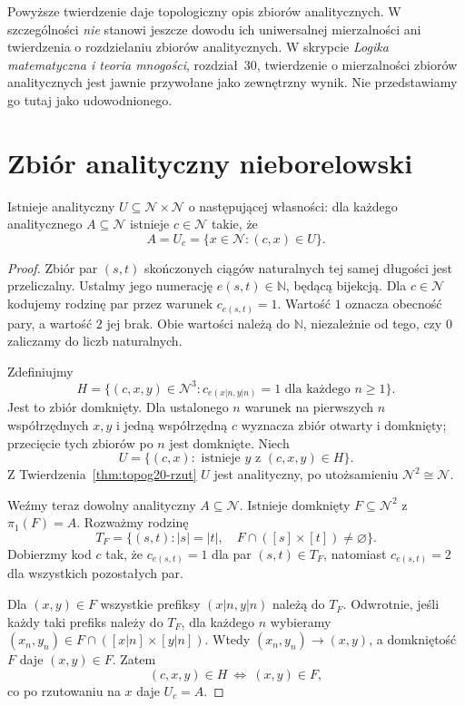 \begin{uwaga}
\label{rem:topog20-no-meas}
Powyższe twierdzenie daje
topologiczny opis zbiorów analitycznych.
W szczególności \emph{nie} stanowi
jeszcze dowodu ich uniwersalnej
mierzalności ani twierdzenia
o rozdzielaniu zbiorów analitycznych.
W skrypcie \emph{Logika matematyczna
i teoria mnogości}, rozdział~30,
twierdzenie o mierzalności
zbiorów analitycznych jest
jawnie przywołane jako zewnętrzny wynik.
Nie przedstawiamy go tutaj
jako udowodnionego.
\end{uwaga}

\section{Zbiór analityczny nieborelowski}
\label{sec:topog20-nieborelowski}

\begin{lemat}
\label{lem:topog20-universal}
Istnieje analityczny
\(U\subseteq\mathcal N\times\mathcal N\)
o następującej własności:
dla każdego analitycznego
\(A\subseteq\mathcal N\)
istnieje \(c\in\mathcal N\)
takie, że
\[
 A=U_c=\{x\in\mathcal N:(c,x)\in U\}.
\]
\end{lemat}
\begin{proof}
Zbiór par \((s,t)\) skończonych
ciągów naturalnych tej samej
długości jest przeliczalny.
Ustalmy jego numerację
\(e(s,t)\in\mathbb N\), będącą bijekcją.
Dla \(c\in\mathcal N\) kodujemy
rodzinę par przez warunek
\(c_{e(s,t)}=1\).
Wartość \(1\) oznacza obecność pary,
a wartość \(2\) jej brak.
Obie wartości należą do \(\mathbb N\),
niezależnie od tego, czy \(0\)
zaliczamy do liczb naturalnych.

Zdefiniujmy
\[
 H=\{(c,x,y)\in\mathcal N^3:
       c_{e(x|n,y|n)}=1
       \text{ dla każdego }n\ge1\}.
\]
Jest to zbiór domknięty.
Dla ustalonego \(n\)
warunek na pierwszych
\(n\) współrzędnych \(x,y\)
i jedną współrzędną \(c\)
wyznacza zbiór otwarty
i domknięty; przecięcie
tych zbiorów po \(n\)
jest domknięte.
Niech
\[
 U=\{(c,x):\text{ istnieje }y
                   \text{ z }(c,x,y)\in H\}.
\]
Z Twierdzenia~\ref{thm:topog20-rzut}
\(U\) jest analityczny,
po utożsamieniu
\(\mathcal N^2\cong\mathcal N\).

Weźmy teraz dowolny analityczny
\(A\subseteq\mathcal N\).
Istnieje domknięty
\(F\subseteq\mathcal N^2\)
z \(\pi_1(F)=A\).
Rozważmy rodzinę
\[
 T_F=\{(s,t):
    |s|=|t|,\quad
    F\cap([s]\times[t])
           \ne\varnothing\}.
\]
Dobierzmy kod \(c\) tak,
że \(c_{e(s,t)}=1\) dla par
\((s,t)\in T_F\), natomiast
\(c_{e(s,t)}=2\) dla
wszystkich pozostałych par.

Dla \((x,y)\in F\)
wszystkie prefiksy
\((x|n,y|n)\) należą do \(T_F\).
Odwrotnie, jeśli każdy
taki prefiks należy do \(T_F\),
dla każdego \(n\) wybieramy
\((x_n,y_n)\in
F\cap([x|n]\times[y|n])\).
Wtedy \((x_n,y_n)\to(x,y)\),
a domkniętość \(F\) daje
\((x,y)\in F\).
Zatem
\[
 (c,x,y)\in H
   \ \Longleftrightarrow\ (x,y)\in F,
\]
co po rzutowaniu na \(x\)
daje \(U_c=A\).
\end{proof}


